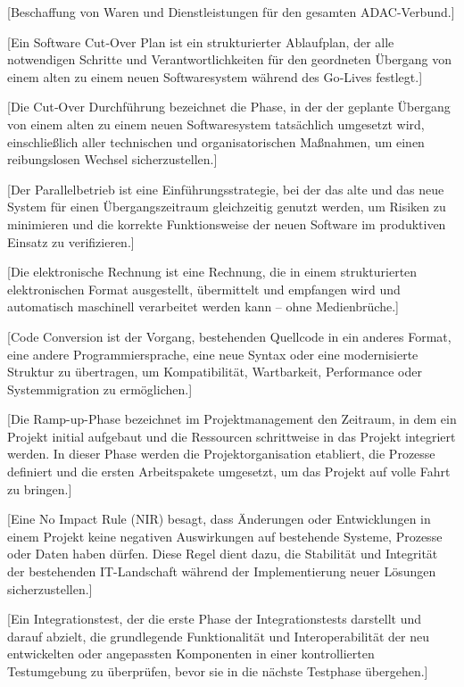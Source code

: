 [Beschaffung von Waren und Dienstleistungen für den gesamten ADAC-Verbund.]

[Ein Software Cut‑Over Plan ist ein strukturierter Ablaufplan, der alle notwendigen Schritte und Verantwortlichkeiten für den geordneten Übergang von einem alten zu einem neuen Softwaresystem während des Go‑Lives festlegt.]

[Die Cut‑Over Durchführung bezeichnet die Phase, in der der geplante Übergang von einem alten zu einem neuen Softwaresystem tatsächlich umgesetzt wird, einschließlich aller technischen und organisatorischen Maßnahmen, um einen reibungslosen Wechsel sicherzustellen.]

[Der Parallelbetrieb ist eine Einführungsstrategie, bei der das alte und das neue System für einen Übergangszeitraum gleichzeitig genutzt werden, um Risiken zu minimieren und die korrekte Funktionsweise der neuen Software im produktiven Einsatz zu verifizieren.]

[Die elektronische Rechnung ist eine Rechnung, die in einem strukturierten elektronischen Format ausgestellt, übermittelt und empfangen wird und automatisch maschinell verarbeitet werden kann – ohne Medienbrüche.]

[Code Conversion ist der Vorgang, bestehenden Quellcode in ein anderes Format, eine andere Programmiersprache, eine neue Syntax oder eine modernisierte Struktur zu übertragen, um Kompatibilität, Wartbarkeit, Performance oder Systemmigration zu ermöglichen.]


[Die Ramp-up-Phase bezeichnet im Projektmanagement den Zeitraum, in dem ein Projekt initial aufgebaut und die Ressourcen schrittweise in das Projekt integriert werden. In dieser Phase werden die Projektorganisation etabliert, die Prozesse definiert und die ersten Arbeitspakete umgesetzt, um das Projekt auf volle Fahrt zu bringen.]

[Eine No Impact Rule (NIR) besagt, dass Änderungen oder Entwicklungen in einem Projekt keine negativen Auswirkungen auf bestehende Systeme, Prozesse oder Daten haben dürfen. Diese Regel dient dazu, die Stabilität und Integrität der bestehenden IT-Landschaft während der Implementierung neuer Lösungen sicherzustellen.]

[Ein Integrationstest, der die erste Phase der Integrationstests darstellt und darauf abzielt, die grundlegende Funktionalität und Interoperabilität der neu entwickelten oder angepassten Komponenten in einer kontrollierten Testumgebung zu überprüfen, bevor sie in die nächste Testphase übergehen.]